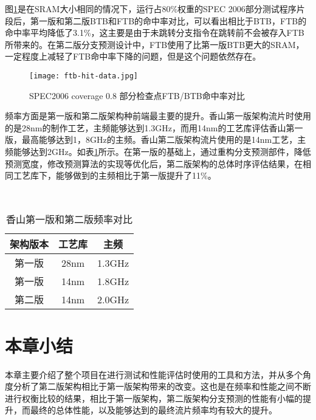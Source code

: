 图\ref{fig:figure63}是在SRAM大小相同的情况下，运行占80\%权重的SPEC 2006部分测试程序片段后，第一版和第二版BTB和FTB的命中率对比，可以看出相比于BTB，FTB的命中率平均降低了3.1\%，这主要是由于未跳转分支指令在跳转前不会被存入FTB所带来的。在第二版分支预测设计中，FTB使用了比第一版BTB更大的SRAM，一定程度上减轻了FTB命中率下降的问题，但是这个问题依然存在。



\begin{figure}[htb]
	\centering
	\setlength\tabcolsep{3pt}  %
	\vspace{5pt} %
	\texttt{[image: ftb-hit-data.jpg]}
	\caption{SPEC2006 coverage 0.8 部分检查点FTB/BTB命中率对比}
	\label{fig:figure63}
\end{figure}


频率方面是第一版和第二版架构种前端最主要的提升。香山第一版架构流片时使用的是28nm的制作工艺，主频能够达到1.3GHz，而用14nm的工艺库评估香山第一版，最高能够达到1，8GHz的主频。香山第二版架构流片使用的是14nm工艺，主频能够达到2GHz。如表\ref{tb:table3}所示。在第一版的基础上，通过重构分支预测部件，降低预测宽度，修改预测算法的实现等优化后，第二版架构的总体时序评估结果，在相同工艺库下，能够做到的主频相比于第一版提升了11\%。

~\\

\begin{table}[!h]
	\caption{香山第一版和第二版频率对比}
	\label{tb:table3}
	\centering
	\begin{tabular}{|c|c|c|}
		\hline
		架构版本   & 工艺库   & 主频   \\ \hline
		第一版 & 28nm & 1.3GHz \\ \hline
		第一版 & 14nm & 1.8GHz \\ \hline
		第二版 & 14nm & 2.0GHz \\ \hline
	\end{tabular}
\end{table}


\section{本章小结}

本章主要介绍了整个项目在进行测试和性能评估时使用的工具和方法，并从多个角度分析了第二版架构相比于第一版架构带来的改变。这也是在频率和性能之间不断进行权衡比较的结果，相比于第一版架构，第二版架构分支预测的性能有小幅的提升，而最终的总体性能，以及能够达到的最终流片频率均有较大的提升。